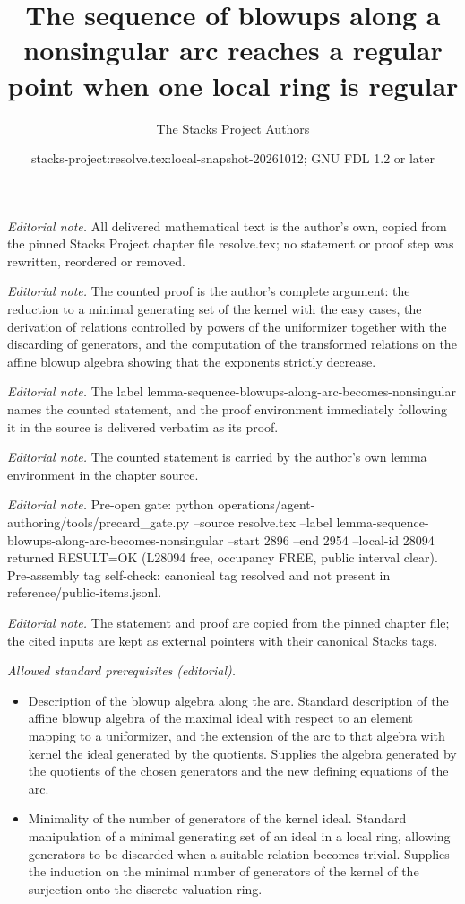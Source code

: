 \documentclass[10pt,a4paper]{amsart}
\title{The sequence of blowups along a nonsingular arc reaches a regular point when one local ring is regular}
\author{The Stacks Project Authors}
\date{stacks-project:resolve.tex:local-snapshot-20261012; GNU FDL 1.2 or later}
\theoremstyle{plain}
\theoremstyle{definition}
\theoremstyle{remark}
\numberwithin{equation}{subsection}
\begin{document}
\maketitle
\noindent\textit{Editorial note.} All delivered mathematical text is the author's own, copied from the pinned Stacks Project chapter file resolve.tex; no statement or proof step was rewritten, reordered or removed.\par\medskip
\noindent\textit{Editorial note.} The counted proof is the author's complete argument: the reduction to a minimal generating set of the kernel with the easy cases, the derivation of relations controlled by powers of the uniformizer together with the discarding of generators, and the computation of the transformed relations on the affine blowup algebra showing that the exponents strictly decrease.\par\medskip
\noindent\textit{Editorial note.} The label lemma-sequence-blowups-along-arc-becomes-nonsingular names the counted statement, and the proof environment immediately following it in the source is delivered verbatim as its proof.\par\medskip
\noindent\textit{Editorial note.} The counted statement is carried by the author's own lemma environment in the chapter source.\par\medskip
\noindent\textit{Editorial note.} Pre-open gate: python operations/agent-authoring/tools/precard\_gate.py --source resolve.tex --label lemma-sequence-blowups-along-arc-becomes-nonsingular --start 2896 --end 2954 --local-id 28094 returned RESULT=OK (L28094 free, occupancy FREE, public interval clear). Pre-assembly tag self-check: canonical tag resolved and not present in reference/public-items.jsonl.\par\medskip
\noindent\textit{Editorial note.} The statement and proof are copied from the pinned chapter file; the cited inputs are kept as external pointers with their canonical Stacks tags.\par\medskip
\noindent\textit{Allowed standard prerequisites (editorial).}\begin{itemize}
\item Description of the blowup algebra along the arc. Standard description of the affine blowup algebra of the maximal ideal with respect to an element mapping to a uniformizer, and the extension of the arc to that algebra with kernel the ideal generated by the quotients. Supplies the algebra generated by the quotients of the chosen generators and the new defining equations of the arc.
\item Minimality of the number of generators of the kernel ideal. Standard manipulation of a minimal generating set of an ideal in a local ring, allowing generators to be discarded when a suitable relation becomes trivial. Supplies the induction on the minimal number of generators of the kernel of the surjection onto the discrete valuation ring.
\end{itemize}\medskip
\end{document}
